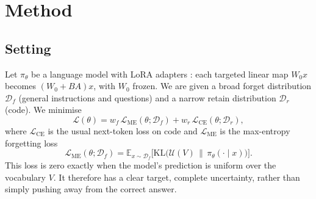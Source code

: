 \documentclass{article}
\newcommand{\Df}{\mathcal{D}_f}
\newcommand{\Dr}{\mathcal{D}_r}
\newcommand{\me}{\mathrm{ME}}
\begin{document}
\begin{table}[t]
\centering
\small
\caption{Our study next to the closest prior work.}
\label{tab:compare}
\end{table}

\section{Method}
\label{sec:method}

\subsection{Setting}
Let $\pi_\theta$ be a language model with LoRA adapters \citep{hu2022lora}: each targeted linear map $W_0x$ becomes $(W_0+BA)x$, with $W_0$ frozen. We are given a broad forget distribution $\Df$ (general instructions and questions) and a narrow retain distribution $\Dr$ (code). We minimise
\begin{equation}
\mathcal{L}(\theta) = w_f\,\mathcal{L}_{\me}(\theta;\Df) + w_r\,\mathcal{L}_{\mathrm{CE}}(\theta;\Dr),
\end{equation}
where $\mathcal{L}_{\mathrm{CE}}$ is the usual next-token loss on code and $\mathcal{L}_{\me}$ is the max-entropy forgetting loss
\begin{equation}
\mathcal{L}_{\me}(\theta;\Df) = \mathbb{E}_{x\sim\Df}\Big[\mathrm{KL}\big(\mathcal{U}(V)\,\big\|\,\pi_\theta(\cdot\mid x)\big)\Big].
\end{equation}
This loss is zero exactly when the model's prediction is uniform over the vocabulary $V$. It therefore has a clear target, complete uncertainty, rather than simply pushing away from the correct answer.
\end{document}
